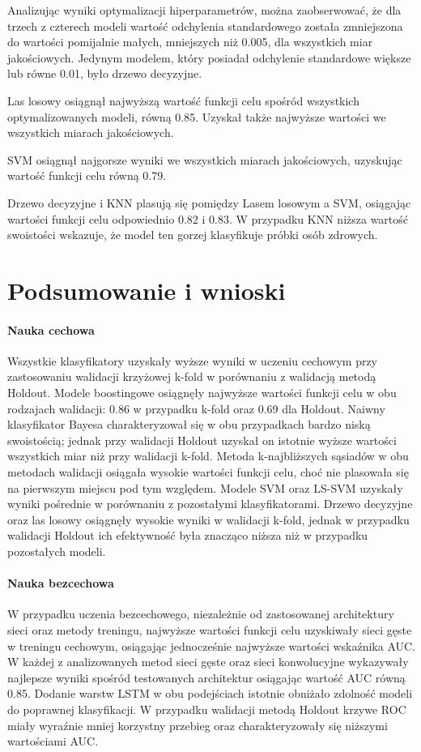 \documentclass[a4paper,twoside,12pt]{book}
\begin{document}
Analizując wyniki optymalizacji hiperparametrów, można zaobserwować, że dla trzech z czterech modeli wartość odchylenia standardowego została zmniejszona do wartości pomijalnie małych, mniejszych niż 0.005, dla wszystkich miar jakościowych. Jedynym modelem, który posiadał odchylenie standardowe większe lub równe 0.01, było drzewo decyzyjne.

Las losowy osiągnął najwyższą wartość funkcji celu spośród wszystkich optymalizowanych modeli, równą 0.85. Uzyskał także najwyższe wartości we wszystkich miarach jakościowych.

SVM osiągnął najgorsze wyniki we wszystkich miarach jakościowych, uzyskując wartość funkcji celu równą 0.79.

Drzewo decyzyjne i KNN plasują się pomiędzy Lasem losowym a SVM, osiągając wartości funkcji celu odpowiednio 0.82 i 0.83. W przypadku KNN niższa wartość swoistości wskazuje, że model ten gorzej klasyfikuje próbki osób zdrowych.


\chapter{Podsumowanie i wnioski}
\subsubsection{Nauka cechowa}
Wszystkie klasyfikatory uzyskały wyższe wyniki w uczeniu cechowym przy zastosowaniu walidacji krzyżowej k-fold w porównaniu z walidacją metodą Holdout. Modele boostingowe osiągnęły najwyższe wartości funkcji celu w obu rodzajach walidacji: 0.86 w przypadku k-fold oraz 0.69 dla Holdout. Naiwny klasyfikator Bayesa charakteryzował się w obu przypadkach bardzo niską swoistością; jednak przy walidacji Holdout uzyskał on istotnie wyższe wartości wszystkich miar niż przy walidacji k-fold. Metoda k-najbliższych sąsiadów w obu metodach walidacji osiągała wysokie wartości funkcji celu, choć nie plasowała się na pierwszym miejscu pod tym względem. Modele SVM oraz LS-SVM uzyskały wyniki pośrednie w porównaniu z pozostałymi klasyfikatorami. Drzewo decyzyjne oraz las losowy osiągnęły wysokie wyniki w walidacji k-fold, jednak w przypadku walidacji Holdout ich efektywność była znacząco niższa niż w przypadku pozostałych modeli.\\



\subsubsection{Nauka bezcechowa}
W przypadku uczenia bezcechowego, niezależnie od zastosowanej architektury sieci oraz metody treningu, najwyższe wartości funkcji celu uzyskiwały sieci gęste w treningu cechowym, osiągając jednocześnie najwyższe wartości wskaźnika AUC. W każdej z analizowanych metod sieci gęste oraz sieci konwolucyjne wykazywały najlepsze wyniki spośród testowanych architektur osiągając wartość AUC równą 0.85. Dodanie warstw LSTM w obu podejściach istotnie obniżało zdolność modeli do poprawnej klasyfikacji. W przypadku walidacji metodą Holdout krzywe ROC miały wyraźnie mniej korzystny przebieg oraz charakteryzowały się niższymi wartościami AUC.\\
\end{document}
